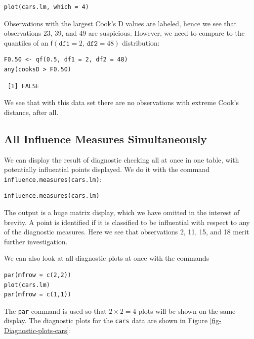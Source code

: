 \documentclass[captions=tableheading]{scrbook}
\begin{document}
\lstset{language=R}
\begin{lstlisting}
plot(cars.lm, which = 4)
\end{lstlisting}





Observations with the largest Cook's D values are labeled, hence we see that observations 23, 39, and 49 are suspicious. However, we need to compare to the quantiles of an \( \mathsf{f}(\mathtt{df1} = 2, \, \mathtt{df2} = 48) \) distribution:


\lstset{language=R}
\begin{lstlisting}
F0.50 <- qf(0.5, df1 = 2, df2 = 48)
any(cooksD > F0.50)
\end{lstlisting}

\begin{verbatim}
 [1] FALSE
\end{verbatim}

We see that with this data set there are no observations with extreme Cook's distance, after all.
\subsection{All Influence Measures Simultaneously}
\label{sec-11-5-5}


We can display the result of diagnostic checking all at once in one table, with potentially influential points displayed. We do it with the command \texttt{influence.measures(cars.lm)}:


\lstset{language=R}
\begin{lstlisting}
influence.measures(cars.lm)
\end{lstlisting}

The output is a huge matrix display, which we have omitted in the interest of brevity. A point is identified if it is classified to be influential with respect to any of the diagnostic measures. Here we see that observations 2, 11, 15, and 18 merit further investigation.  

We can also look at all diagnostic plots at once with the commands


\lstset{language=R}
\begin{lstlisting}
par(mfrow = c(2,2))
plot(cars.lm)
par(mfrow = c(1,1))
\end{lstlisting}

The \texttt{par} command is used so that \(2\times 2 = 4\) plots will be shown on the same display. The diagnostic plots for the \texttt{cars} data are shown in Figure \ref{fig-Diagnostic-plots-cars}:
\end{document}
